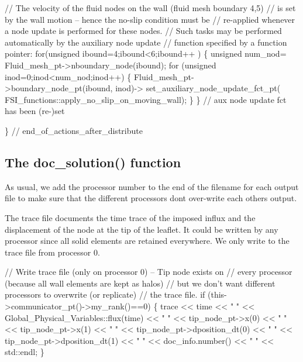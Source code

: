 \begin{DoxyCodeInclude}
 \textcolor{comment}{// The velocity of the fluid nodes on the wall (fluid mesh boundary 4,5)}
 \textcolor{comment}{// is set by the wall motion -- hence the no-slip condition must be}
 \textcolor{comment}{// re-applied whenever a node update is performed for these nodes.}
 \textcolor{comment}{// Such tasks may be performed automatically by the auxiliary node update}
 \textcolor{comment}{// function specified by a function pointer:}
 \textcolor{keywordflow}{for}(\textcolor{keywordtype}{unsigned} ibound=4;ibound<6;ibound++ )
  \{
   \textcolor{keywordtype}{unsigned} num\_nod= Fluid\_mesh\_pt->nboundary\_node(ibound);
   \textcolor{keywordflow}{for} (\textcolor{keywordtype}{unsigned} inod=0;inod<num\_nod;inod++)
    \{
     Fluid\_mesh\_pt->boundary\_node\_pt(ibound, inod)->
      set\_auxiliary\_node\_update\_fct\_pt(
       FSI\_functions::apply\_no\_slip\_on\_moving\_wall);
    \}
  \} \textcolor{comment}{// aux node update fct has been (re-)set}


\} \textcolor{comment}{// end\_of\_actions\_after\_distribute}

\end{DoxyCodeInclude}




\hypertarget{index_doc_solution}{}\subsection{The doc\+\_\+solution() function}\label{index_doc_solution}
As usual, we add the processor number to the end of the filename for each output file to make sure that the different processors don\textquotesingle{}t over-\/write each other\textquotesingle{}s output.

The trace file documents the time trace of the imposed influx and the displacement of the node at the tip of the leaflet. It could be written by any processor since all solid elements are retained everywhere. We only write to the trace file from processor 0.


\begin{DoxyCodeInclude}
 \textcolor{comment}{// Write trace file (only on processor 0) -- Tip node exists on}
 \textcolor{comment}{// every processor (because all wall elements are kept as halos)}
 \textcolor{comment}{// but we don't want different processors to overwrite (or replicate)}
 \textcolor{comment}{// the trace file.}
 \textcolor{keywordflow}{if} (this->communicator\_pt()->my\_rank()==0)
  \{
   trace << time << \textcolor{stringliteral}{" "}
         << Global\_Physical\_Variables::flux(time) << \textcolor{stringliteral}{" "}
         << tip\_node\_pt->x(0) << \textcolor{stringliteral}{" "}
         << tip\_node\_pt->x(1) << \textcolor{stringliteral}{" "}
         << tip\_node\_pt->dposition\_dt(0) << \textcolor{stringliteral}{" "}
         << tip\_node\_pt->dposition\_dt(1) << \textcolor{stringliteral}{" "}
         << doc\_info.number() << \textcolor{stringliteral}{" "}
         << std::endl;
  \}

\end{DoxyCodeInclude}




